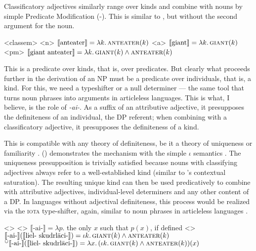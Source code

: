 \documentclass[a4paper, 12pt]{article}
\begin{document}
Classificatory adjectives similarly range over kinds and combine with nouns by simple Predicate Modification (-). This is similar to , but without the second argument for the noun.

\pex<classem>
    \a<n> $\llbracket \text{anteater} \rrbracket = \lambda k.\,\textsc{anteater}(k)$
    \a<a> $\llbracket \text{giant} \rrbracket  = \lambda k.\,\textsc{giant}(k)$
    \a<pm> $\llbracket \text{giant anteater} \rrbracket = \lambda k.\,\textsc{giant}(k) \land \textsc{anteater}(k)$
\xe

This is a predicate over kinds, that is, over predicates. But clearly what proceeds further in the derivation of an NP must be a predicate over individuals, that is, a kind. For this, we need a typeshifter or a null determiner --- the same tool that turns noun phrases into arguments in articleless languages. This is what, I believe, is the role of \textit{-ai-}. As a suffix of an attributive adjective, it presupposes the definiteness of an individual, the DP referent; when combining  with a classificatory adjective, it presupposes the definiteness of a kind.

This is compatible with any theory of definiteness, be it a theory of uniqueness \parencite{russell1905denoting,strawson1950referring} or familiarity \parencite{heim1982semanticsdefiniteindefinite}. (\nextx) demonstrates the mechanism with the simple $\iota$ semantics \parencite{partee1986nounphraseinterpretation}. The uniqueness presupposition is trivially satisfied because nouns with classifying adjectives always refer to a well-established kind (similar to 's contextual saturation). The resulting unique kind can then be used predicatively to combine with attributive adjectives, individual-level determiners and any other content of a DP. In languages without adjectival definiteness, this process would be realized via the \textsc{iota} type-shifter, again, similar to noun phrases in articleless languages \parencite{dayal2004numbermarkingdefiniteness}.

\pex<>
\a<> $\llbracket \text{-ai-} \rrbracket = \lambda p.$ the only $x$ such that $p(x)$, if defined
\a<> $\llbracket \text{-ai-} \rrbracket (\llbracket  \text{liel- skudrlāci-}\rrbracket ) =  \iota k.\,\textsc{giant}(k) \land \textsc{anteater}(k)$
\a $^\cup \llbracket \text{-ai-} \rrbracket(\llbracket \text{liel- skudrlāci-} \rrbracket) = \lambda x.\, (\iota k.\,\textsc{giant}(k) \land \textsc{anteater}(k))(x)$
\xe
\end{document}
